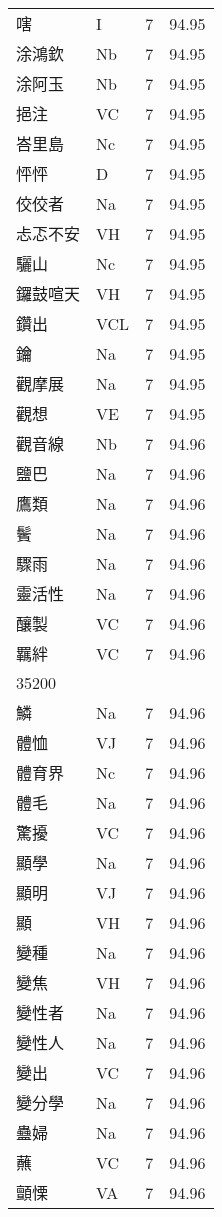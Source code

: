 \documentclass[twocolumn]{book}
\begin{document}
\begin{supertabular}{llrr}
嗐 & I & 7 &  94.95\\
涂鴻欽 & Nb & 7 &  94.95\\
涂阿玉 & Nb & 7 &  94.95\\
挹注 & VC & 7 &  94.95\\
峇里島 & Nc & 7 &  94.95\\
怦怦 & D & 7 &  94.95\\
佼佼者 & Na & 7 &  94.95\\
忐忑不安 & VH & 7 &  94.95\\
驪山 & Nc & 7 &  94.95\\
鑼鼓喧天 & VH & 7 &  94.95\\
鑽出 & VCL & 7 &  94.95\\
鑰 & Na & 7 &  94.95\\
觀摩展 & Na & 7 &  94.95\\
觀想 & VE & 7 &  94.95\\
觀音線 & Nb & 7 &  94.96\\
鹽巴 & Na & 7 &  94.96\\
鷹類 & Na & 7 &  94.96\\
鬢 & Na & 7 &  94.96\\
驟雨 & Na & 7 &  94.96\\
靈活性 & Na & 7 &  94.96\\
釀製 & VC & 7 &  94.96\\
羈絆 & VC & 7 &  94.96\\
35200\\
鱗 & Na & 7 &  94.96\\
體恤 & VJ & 7 &  94.96\\
體育界 & Nc & 7 &  94.96\\
體毛 & Na & 7 &  94.96\\
驚擾 & VC & 7 &  94.96\\
顯學 & Na & 7 &  94.96\\
顯明 & VJ & 7 &  94.96\\
顯 & VH & 7 &  94.96\\
變種 & Na & 7 &  94.96\\
變焦 & VH & 7 &  94.96\\
變性者 & Na & 7 &  94.96\\
變性人 & Na & 7 &  94.96\\
變出 & VC & 7 &  94.96\\
變分學 & Na & 7 &  94.96\\
蠱婦 & Na & 7 &  94.96\\
蘸 & VC & 7 &  94.96\\
顫慄 & VA & 7 &  94.96\\

\end{supertabular}
\end{document}
